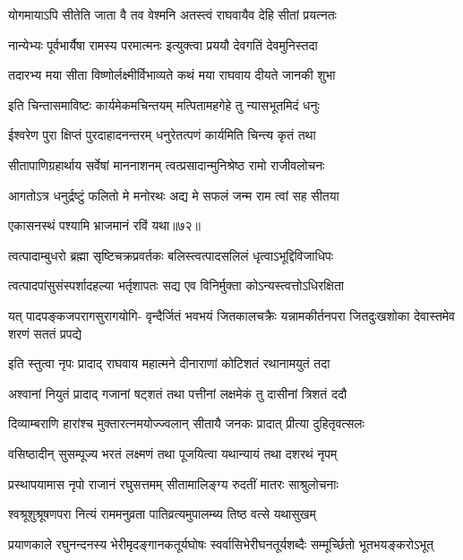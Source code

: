 \twolineshloka
{योगमायाऽपि सीतेति जाता वै तव वेश्मनि}
{अतस्त्वं राघवायैव देहि सीतां प्रयत्नतः} %

\twolineshloka
{नान्येभ्यः पूर्वभार्यैषा रामस्य परमात्मनः}
{इत्युक्त्वा प्रययौ देवगतिं देवमुनिस्तदा} %

\twolineshloka
{तदारभ्य मया सीता विष्णोर्लक्ष्मीर्विभाव्यते}
{कथं मया राघवाय दीयते जानकी शुभा} %

\twolineshloka
{इति चिन्तासमाविष्टः कार्यमेकमचिन्तयम्}
{मत्पितामहगेहे तु न्यासभूतमिदं धनुः} %

\twolineshloka
{ईश्वरेण पुरा क्षिप्तं पुरदाहादनन्तरम्}
{धनुरेतत्पणं कार्यमिति चिन्त्य कृतं तथा} %

\twolineshloka
{सीतापाणिग्रहार्थाय सर्वेषां माननाशनम्}
{त्वत्प्रसादान्मुनिश्रेष्ठ रामो राजीवलोचनः} %

\twolineshloka
{आगतोऽत्र धनुर्द्रष्टुं फलितो मे मनोरथः}
{अद्य मे सफलं जन्म राम त्वां सह सीतया} %

{एकासनस्थं पश्यामि भ्राजमानं रविं यथा॥७२॥} %


\twolineshloka
{त्वत्पादाम्बुधरो ब्रह्मा सृष्टिचक्रप्रवर्तकः}
{बलिस्त्वत्पादसलिलं धृत्वाऽभूद्दिविजाधिपः} %

\twolineshloka
{त्वत्पादपांसुसंस्पर्शादहल्या भर्तृशापतः}
{सद्य एव विनिर्मुक्ता कोऽन्यस्त्वत्तोऽधिरक्षिता} %

\fourlineindentedshloka
{यत् पादपङ्कजपरागसुरागयोगि-}
{वृन्दैर्जितं भवभयं जितकालचक्रैः}
{यन्नामकीर्तनपरा जितदुःखशोका}
{देवास्तमेव शरणं सततं प्रपद्ये} %

\twolineshloka
{इति स्तुत्वा नृपः प्रादाद् राघवाय महात्मने}
{दीनाराणां कोटिशतं रथानामयुतं तदा} %

\twolineshloka
{अश्वानां नियुतं प्रादाद् गजानां षट्शतं तथा}
{पत्तीनां लक्षमेकं तु दासीनां त्रिशतं ददौ} %

\twolineshloka
{दिव्याम्बराणि हारांश्च मुक्तारत्नमयोज्ज्वलान्}
{सीतायै जनकः प्रादात् प्रीत्या दुहितृवत्सलः} %

\twolineshloka
{वसिष्ठादीन् सुसम्पूज्य भरतं लक्ष्मणं तथा}
{पूजयित्वा यथान्यायं तथा दशरथं नृपम्} %

\twolineshloka
{प्रस्थापयामास नृपो राजानं रघुसत्तमम्}
{सीतामालिङ्ग्य रुदतीं मातरः साश्रुलोचनाः} %

\twolineshloka
{श्वश्रूशुश्रूषणपरा नित्यं राममनुव्रता}
{पातिव्रत्यमुपालम्ब्य तिष्ठ वत्से यथासुखम्} %

\fourlineindentedshloka
{प्रयाणकाले रघुनन्दनस्य}
{भेरीमृदङ्गानकतूर्यघोषः}
{स्वर्वासिभेरीघनतूर्यशब्दैः}
{सम्मूर्च्छितो भूतभयङ्करोऽभूत्} %

